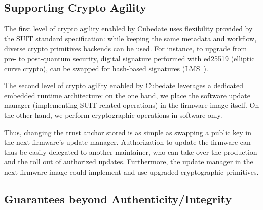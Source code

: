 \subsection{Supporting Crypto Agility}
The first level of crypto agility enabled by Cubedate uses flexibility provided by the SUIT standard specification: while keeping the same metadata and workflow, diverse crypto primitives backends can be used. For instance, to upgrade from pre- to post-quantum security, digital signature performed with ed25519 (elliptic curve crypto), can be swapped for hash-based signatures (LMS~\cite{banegas2022quantum-suit}).

The second level of crypto agility enabled by Cubedate leverages a dedicated embedded runtime architecture:
on the one hand, we place the software update manager (implementing SUIT-related operations) in the firmware image itself. 
On the other hand, we perform cryptographic operations in software only.

Thus, changing the trust anchor stored is as simple as swapping a public key in the next firmware's update manager.
Authorization to update the firmware can thus be easily  delegated to another maintainer, 
who can take over the production and the roll out of authorized updates.
Furthermore, the update manager in the next firmware image could
implement and use upgraded cryptographic primitives. 

\subsection{Guarantees beyond Authenticity/Integrity}

